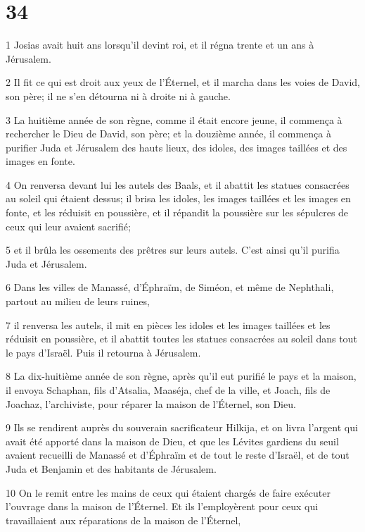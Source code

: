 \chapter{34}

\par 1 Josias avait huit ans lorsqu'il devint roi, et il régna trente et un ans à Jérusalem.
\par 2 Il fit ce qui est droit aux yeux de l'Éternel, et il marcha dans les voies de David, son père; il ne s'en détourna ni à droite ni à gauche.
\par 3 La huitième année de son règne, comme il était encore jeune, il commença à rechercher le Dieu de David, son père; et la douzième année, il commença à purifier Juda et Jérusalem des hauts lieux, des idoles, des images taillées et des images en fonte.
\par 4 On renversa devant lui les autels des Baals, et il abattit les statues consacrées au soleil qui étaient dessus; il brisa les idoles, les images taillées et les images en fonte, et les réduisit en poussière, et il répandit la poussière sur les sépulcres de ceux qui leur avaient sacrifié;
\par 5 et il brûla les ossements des prêtres sur leurs autels. C'est ainsi qu'il purifia Juda et Jérusalem.
\par 6 Dans les villes de Manassé, d'Éphraïm, de Siméon, et même de Nephthali, partout au milieu de leurs ruines,
\par 7 il renversa les autels, il mit en pièces les idoles et les images taillées et les réduisit en poussière, et il abattit toutes les statues consacrées au soleil dans tout le pays d'Israël. Puis il retourna à Jérusalem.
\par 8 La dix-huitième année de son règne, après qu'il eut purifié le pays et la maison, il envoya Schaphan, fils d'Atsalia, Maaséja, chef de la ville, et Joach, fils de Joachaz, l'archiviste, pour réparer la maison de l'Éternel, son Dieu.
\par 9 Ils se rendirent auprès du souverain sacrificateur Hilkija, et on livra l'argent qui avait été apporté dans la maison de Dieu, et que les Lévites gardiens du seuil avaient recueilli de Manassé et d'Éphraïm et de tout le reste d'Israël, et de tout Juda et Benjamin et des habitants de Jérusalem.
\par 10 On le remit entre les mains de ceux qui étaient chargés de faire exécuter l'ouvrage dans la maison de l'Éternel. Et ils l'employèrent pour ceux qui travaillaient aux réparations de la maison de l'Éternel,
